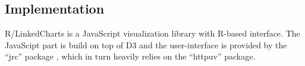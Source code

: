 \documentclass[twocolumn,10pt]{article}
\begin{document}
\subsection{Implementation}

R/LinkedCharts is a JavaScript visualization library with R-based \citep{R_2019} interface. The JavaScipt part is build on top of D3 \citep{bostock_2011} and the user-interface is provided by the ``jrc'' package \citep{jrc_2020}, which in turn heavily relies on the ``httpuv'' \citep{cheng_2020} package.

\begin{small} 
\balance

\end{small}
\end{document}
